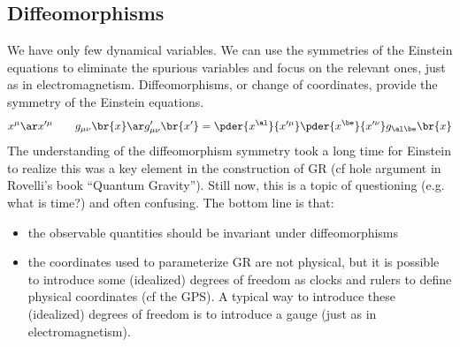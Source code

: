 \documentclass{article}
\begin{document}
\subsection{Diffeomorphisms}
We have only few dynamical variables. We can use the symmetries of the Einstein equations to eliminate the spurious variables and focus on the relevant ones, just as in electromagnetism. Diffeomorphisms, or change of coordinates, provide the symmetry of the Einstein equations.
\[ x^\mu \ar x'^\mu \qquad g_{\mu\nu}\br{x} \ar g'_{\mu\nu}\br{x'} = \pder{x^\al}{x'^\mu}\pder{x^\be}{x'^\nu}g_{\al\be}\br{x} \]
The understanding of the diffeomorphism symmetry took a long time for Einstein to realize this was a key element in the construction of GR (cf hole argument in Rovelli’s book “Quantum Gravity”). Still now, this is a topic of questioning (e.g. what is time?) and often confusing. The bottom line is that:
\begin{itemize}
    \item the observable quantities should be invariant under diffeomorphisms
    \item the coordinates used to parameterize GR are not physical, but it is possible to introduce some (idealized) degrees of freedom as clocks and rulers to define physical coordinates (cf the GPS). A typical way to introduce these (idealized) degrees of freedom is to introduce a gauge (just as in electromagnetism).
\end{itemize}
\end{document}
